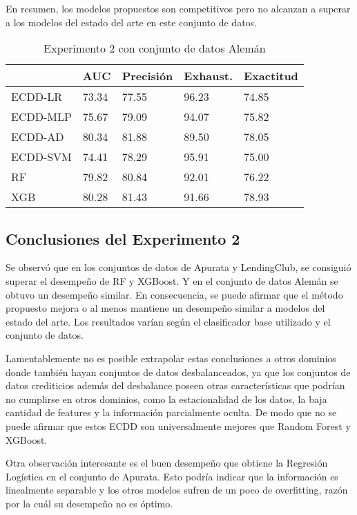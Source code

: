 En resumen, los modelos propuestos son competitivos pero no alcanzan a superar a los modelos del estado del arte en este conjunto de datos.

\begin{table}[htbp]
\centering
\caption{Experimento 2 con conjunto de datos Alemán}
\label{tab:german-proc2}
\begin{tabularx}{0.75\textwidth}{|l|Y Y Y Y|}
				\hline
				& AUC		& Precisión	& Exhaust.		& Exactitud	\\
				\hline
ECDD-LR			& 73.34		& 77.55		& 96.23			& 74.85		\\		%
ECDD-MLP		& 75.67		& 79.09		& 94.07			& 75.82		\\		%
ECDD-AD			& 80.34		& 81.88		& 89.50			& 78.05		\\		%
ECDD-SVM		& 74.41		& 78.29		& 95.91			& 75.00		\\		%
				\hline
RF				& 79.82		& 80.84		& 92.01			& 76.22		\\		%
XGB				& 80.28		& 81.43		& 91.66			& 78.93		\\		%
				\hline
\end{tabularx}
\end{table}

\subsection{Conclusiones del Experimento 2}

Se observó que en los conjuntos de datos de Apurata y LendingClub, se consiguió superar el desempeño de \ac{RF} y \ac{XGBoost}. Y en el conjunto de datos Alemán se obtuvo un desempeño similar. En consecuencia, se puede afirmar que el método propuesto mejora o al menos mantiene un desempeño similar a modelos del estado del arte. Los resultados varían según el clasificador base utilizado y el conjunto de datos.

Lamentablemente no es posible extrapolar estas conclusiones a otros dominios donde también hayan conjuntos de datos desbalanceados, ya que los conjuntos de datos crediticios además del desbalance poseen otras características que podrían no cumplirse en otros dominios, como la estacionalidad de los datos, la baja cantidad de features y la información parcialmente oculta. De modo que no se puede afirmar que estos \ac{ECDD} son universalmente mejores que Random Forest y XGBoost.

Otra observación interesante es el buen desempeño que obtiene la Regresión Logística en el conjunto de Apurata. Esto podría indicar que la información es linealmente separable y los otros modelos sufren de un poco de overfitting, razón por la cuál su desempeño no es óptimo.

